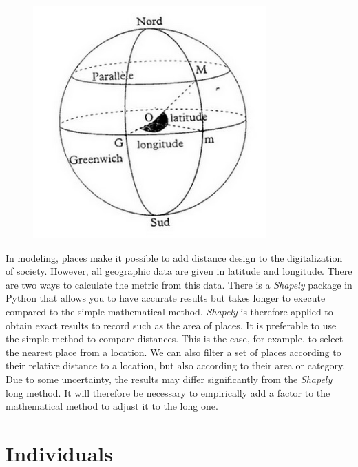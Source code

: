 \begin{figure}
  \centering
  \includegraphics[width=\linewidth]{media/geographie.png}
\end{figure}

In modeling, places make it possible to add
distance design to the digitalization of society. However, all geographic data are given in latitude and longitude. There are two ways to calculate the metric from this data. There is a \textit{Shapely} package in Python that allows you to have accurate results but takes longer to execute compared to the simple mathematical method. \textit{Shapely} is therefore applied to obtain exact results to record such as the area of places. It is preferable to use the simple method to compare distances. This is the case, for example, to select the nearest place from a location. We can also filter a set of places according to their relative distance to a location, but also according to their area or category. Due to some uncertainty, the results may differ significantly from the \textit{Shapely} long method. It will therefore be necessary to empirically add a factor to the mathematical method to adjust it to the long one.\\

\newpage

\section{Individuals}

